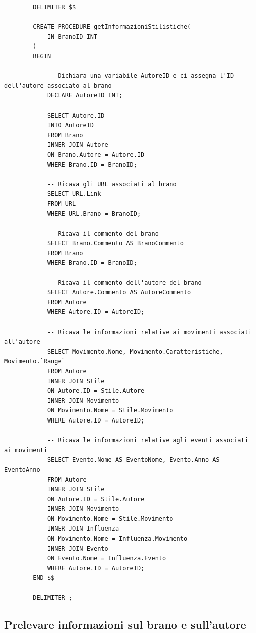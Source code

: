 \documentclass{article}
\begin{document}
    \begin{verbatim}
        DELIMITER $$

        CREATE PROCEDURE getInformazioniStilistiche(
            IN BranoID INT
        )
        BEGIN

            -- Dichiara una variabile AutoreID e ci assegna l'ID dell'autore associato al brano
            DECLARE AutoreID INT;

            SELECT Autore.ID
            INTO AutoreID
            FROM Brano
            INNER JOIN Autore
            ON Brano.Autore = Autore.ID
            WHERE Brano.ID = BranoID;

            -- Ricava gli URL associati al brano
            SELECT URL.Link
            FROM URL
            WHERE URL.Brano = BranoID;

            -- Ricava il commento del brano
            SELECT Brano.Commento AS BranoCommento
            FROM Brano
            WHERE Brano.ID = BranoID;

            -- Ricava il commento dell'autore del brano
            SELECT Autore.Commento AS AutoreCommento
            FROM Autore
            WHERE Autore.ID = AutoreID;

            -- Ricava le informazioni relative ai movimenti associati all'autore
            SELECT Movimento.Nome, Movimento.Caratteristiche, Movimento.`Range`
            FROM Autore
            INNER JOIN Stile
            ON Autore.ID = Stile.Autore
            INNER JOIN Movimento
            ON Movimento.Nome = Stile.Movimento
            WHERE Autore.ID = AutoreID;

            -- Ricava le informazioni relative agli eventi associati ai movimenti
            SELECT Evento.Nome AS EventoNome, Evento.Anno AS EventoAnno
            FROM Autore
            INNER JOIN Stile
            ON Autore.ID = Stile.Autore
            INNER JOIN Movimento
            ON Movimento.Nome = Stile.Movimento
            INNER JOIN Influenza
            ON Movimento.Nome = Influenza.Movimento
            INNER JOIN Evento
            ON Evento.Nome = Influenza.Evento
            WHERE Autore.ID = AutoreID;
        END $$

        DELIMITER ;
    \end{verbatim}
    
    \subsection{Prelevare informazioni sul brano
    e sull’autore}
    
\end{document}
